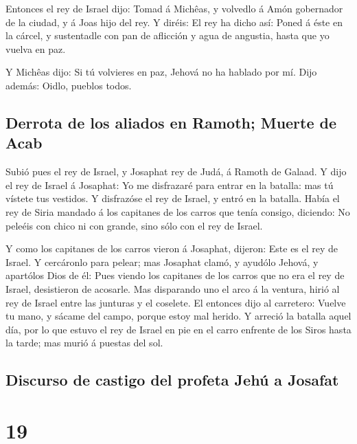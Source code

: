  Entonces el rey de Israel dijo: Tomad á Michêas, y
volvedlo á Amón gobernador de la ciudad, y á Joas hijo del rey.
 Y diréis: El rey ha dicho así: Poned á éste en la cárcel,
y sustentadle con pan de aflicción y agua de angustia, hasta que yo
vuelva en paz.

 Y Michêas dijo: Si tú volvieres en paz, Jehová no ha
hablado por mí. Dijo además: Oidlo, pueblos todos.

\hypertarget{derrota-de-los-aliados-en-ramoth-muerte-de-acab}{%
\subsection{Derrota de los aliados en Ramoth; Muerte de
Acab}\label{derrota-de-los-aliados-en-ramoth-muerte-de-acab}}

 Subió pues el rey de Israel, y Josaphat rey de Judá, á
Ramoth de Galaad.  Y dijo el rey de Israel á Josaphat: Yo
me disfrazaré para entrar en la batalla: mas tú vístete tus vestidos. Y
disfrazóse el rey de Israel, y entró en la batalla.  Había
el rey de Siria mandado á los capitanes de los carros que tenía consigo,
diciendo: No peleéis con chico ni con grande, sino sólo con el rey de
Israel.

 Y como los capitanes de los carros vieron á Josaphat,
dijeron: Este es el rey de Israel. Y cercáronlo para pelear; mas
Josaphat clamó, y ayudólo Jehová, y apartólos Dios de él: 
Pues viendo los capitanes de los carros que no era el rey de Israel,
desistieron de acosarle.  Mas disparando uno el arco á la
ventura, hirió al rey de Israel entre las junturas y el coselete. El
entonces dijo al carretero: Vuelve tu mano, y sácame del campo, porque
estoy mal herido.  Y arreció la batalla aquel día, por lo
que estuvo el rey de Israel en pie en el carro enfrente de los Siros
hasta la tarde; mas murió á puestas del sol.

\hypertarget{discurso-de-castigo-del-profeta-jehuxfa-a-josafat}{%
\subsection{Discurso de castigo del profeta Jehú a
Josafat}\label{discurso-de-castigo-del-profeta-jehuxfa-a-josafat}}

\hypertarget{section-18}{%
\section{19}\label{section-18}}

